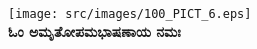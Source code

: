 ~\vfill

\begin{center}
\texttt{[image: src/images/100\_PICT\_6.eps]}\\
{\bf ಓಂ ಅಮೃತೋಪಮಭಾಷಣಾಯ ನಮಃ}
\end{center}

~\vfill
